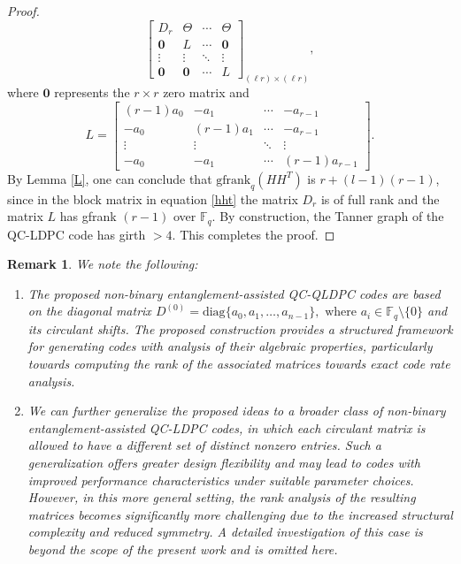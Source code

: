 \documentclass[conference]{IEEEtran}
\newtheorem{remark}{Remark}
\begin{document}
\begin{proof}
\begin{equation}\label{hht}
  \begin{bmatrix} D_{r}&\Theta&\cdots&\Theta\\    \mathbf{0}&L&\cdots&\mathbf{0}\\  
     \vdots&\vdots&\ddots&\vdots\\
      \mathbf{0}&\mathbf{0}&\cdots&L
\end{bmatrix}_{(\ell r)\times (\ell r)}, 
\end{equation}
where $\mathbf{0}$ represents the $r\times r$ zero matrix and 
 {\small \begin{equation*}
   L= \begin{bmatrix}
        (r-1)a_{0} & -a_{1}& \cdots & -a_{r-1}\\
        -a_{0} & (r-1)a_{1}& \cdots & -a_{r-1}\\
        \vdots & \vdots& \ddots & \vdots\\
         -a_{0} & -a_{1}& \cdots & (r-1)a_{r-1}
    \end{bmatrix}. 
\end{equation*}}
By Lemma \ref{L}, one can conclude that $\mathrm{gfrank}_{q}(HH^{T})$ is $r+(l-1)(r-1)$, since in the block matrix in equation \eqref{hht} the matrix $D_{r}$ is of full rank and the matrix $L$ has gfrank $(r-1)$ over $\mathbb{F}_{q}$. By construction, the Tanner graph of the QC-LDPC code has girth $>4$. This completes the proof.
\end{proof}
\begin{remark} We note the following: 
\begin{enumerate}[leftmargin=*]
   \item The proposed non-binary entanglement-assisted QC-QLDPC codes are based on the diagonal matrix $D^{(0)}=\text{diag}\{a_{0},a_{1},\ldots,a_{n-1}\}, \text{ where } a_{i}\in\mathbb{F}_{q}\setminus\{0\}$ and its circulant shifts. The proposed construction provides a structured framework for generating codes with analysis of their algebraic properties, particularly towards computing the rank of the associated matrices towards exact code rate analysis. 
   \item We can further generalize the proposed ideas to a broader class of non-binary entanglement-assisted QC-LDPC codes, in which each circulant matrix is allowed to have a different set of distinct nonzero entries. Such a generalization offers greater design flexibility and may lead to codes with improved performance characteristics under suitable parameter choices. However, in this more general setting, the rank analysis of the resulting matrices becomes significantly more challenging due to the increased structural complexity and reduced symmetry. A detailed investigation of this case is beyond the scope of the present work and is omitted here.
\end{enumerate}
\end{remark}
\end{document}
